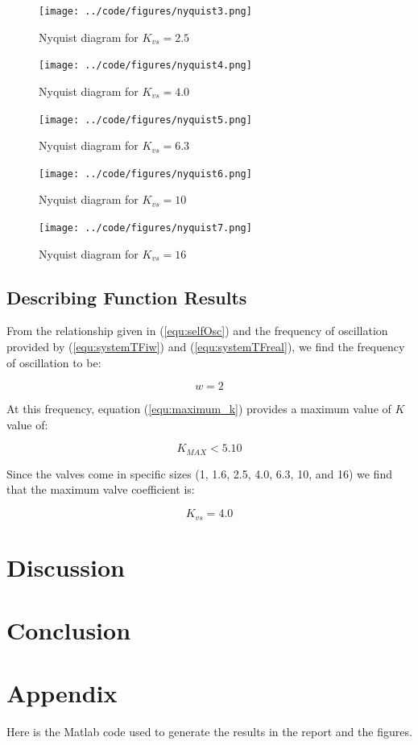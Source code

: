 \documentclass[a4paper, titlepage]{article}
\begin{document}
\begin{figure}[h!]
\center
\texttt{[image: ../code/figures/nyquist3.png]}
\caption{Nyquist diagram for $K_{vs}=2.5$}
\label{fig:nyquist3}
\end{figure}

\begin{figure}[h!]
\center
\texttt{[image: ../code/figures/nyquist4.png]}
\caption{Nyquist diagram for $K_{vs}=4.0$}
\label{fig:nyquist4}
\end{figure}

\begin{figure}[h!]
\center
\texttt{[image: ../code/figures/nyquist5.png]}
\caption{Nyquist diagram for $K_{vs}=6.3$}
\label{fig:nyquist5}
\end{figure}

\begin{figure}[h!]
\center
\texttt{[image: ../code/figures/nyquist6.png]}
\caption{Nyquist diagram for $K_{vs}=10$}
\label{fig:nyquist6}
\end{figure}

\begin{figure}[h!]
\center
\texttt{[image: ../code/figures/nyquist7.png]}
\caption{Nyquist diagram for $K_{vs}=16$}
\label{fig:nyquist7}
\end{figure}

\subsection{Describing Function Results}

From the relationship given in (\ref{equ:selfOsc}) and the frequency of oscillation provided by (\ref{equ:systemTFiw}) and (\ref{equ:systemTFreal}), we find the frequency of oscillation to be:

\begin{equation}
w=2
\label{equ:omega_zero}
\end{equation}

At this frequency, equation (\ref{equ:maximum_k}) provides a maximum value of $K$ value of:

\begin{equation}
K_{MAX} < 5.10
\label{equ:k_valid}
\end{equation}

Since the valves come in specific sizes (1, 1.6, 2.5, 4.0, 6.3, 10, and 16) we find that the maximum valve coefficient is:

\begin{equation}
K_{vs} = 4.0
\label{equ:k_max}
\end{equation}


\section{Discussion}
\section{Conclusion}




\clearpage


\clearpage
\appendix

\section{Appendix}
Here is the Matlab code used to generate the results in the report and the figures.


\end{document}
